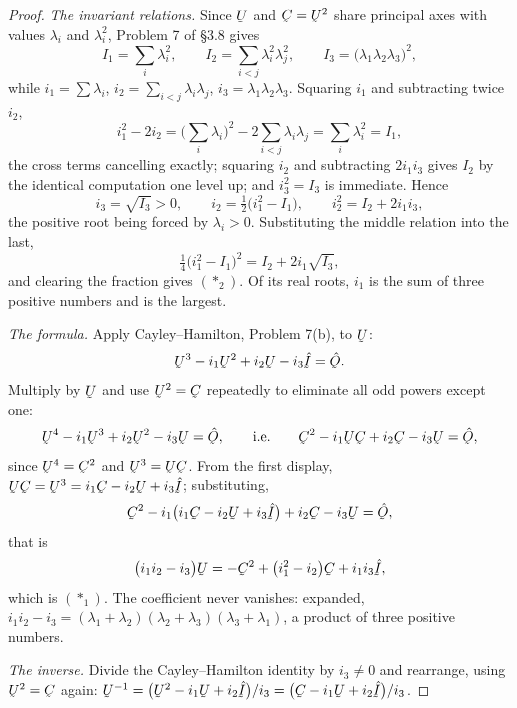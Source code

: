 \begin{proof}
\emph{The invariant relations.} Since $\bU$ and $\bC=\bU^{2}$ share
principal axes with values $\lambda_{i}$ and $\lambda_{i}^{2}$, Problem 7
of \S3.8 gives
\[
   I_{1}=\sum_{i}\lambda_{i}^{2},\qquad
   I_{2}=\sum_{i<j}\lambda_{i}^{2}\lambda_{j}^{2},\qquad
   I_{3}=\big(\lambda_{1}\lambda_{2}\lambda_{3}\big)^{2},
\]
while $i_{1}=\sum\lambda_{i}$, $i_{2}=\sum_{i<j}\lambda_{i}\lambda_{j}$,
$i_{3}=\lambda_{1}\lambda_{2}\lambda_{3}$. Squaring $i_{1}$ and
subtracting twice $i_{2}$,
\[
   i_{1}^{2}-2i_{2}
   =\Big(\sum_{i}\lambda_{i}\Big)^{2}-2\sum_{i<j}\lambda_{i}\lambda_{j}
   =\sum_{i}\lambda_{i}^{2}=I_{1},
\]
the cross terms cancelling exactly; squaring $i_{2}$ and subtracting
$2i_{1}i_{3}$ gives $I_{2}$ by the identical computation one level up; and
$i_{3}^{2}=I_{3}$ is immediate. Hence
\[
   i_{3}=\sqrt{I_{3}}>0,\qquad
   i_{2}=\tfrac12\big(i_{1}^{2}-I_{1}\big),\qquad
   i_{2}^{2}=I_{2}+2i_{1}i_{3},
\]
the positive root being forced by $\lambda_{i}>0$. Substituting the middle
relation into the last,
\[
   \tfrac14\big(i_{1}^{2}-I_{1}\big)^{2}=I_{2}+2i_{1}\sqrt{I_{3}},
\]
and clearing the fraction gives $(\ast_{2})$. Of its real roots, $i_{1}$ is
the sum of three positive numbers and is the largest.

\emph{The formula.} Apply Cayley--Hamilton, Problem 7(b), to $\bU$:
\[
   \bU^{3}-i_{1}\bU^{2}+i_{2}\bU-i_{3}\hI=\hOb .
\]
Multiply by $\bU$ and use $\bU^{2}=\bC$ repeatedly to eliminate all odd
powers except one:
\[
   \bU^{4}-i_{1}\bU^{3}+i_{2}\bU^{2}-i_{3}\bU=\hOb,
   \qquad\text{i.e.}\qquad
   \bC^{2}-i_{1}\bU\bC+i_{2}\bC-i_{3}\bU=\hOb ,
\]
since $\bU^{4}=\bC^{2}$ and $\bU^{3}=\bU\bC$. From the first display,
$\bU\bC=\bU^{3}=i_{1}\bC-i_{2}\bU+i_{3}\hI$; substituting,
\[
   \bC^{2}-i_{1}\big(i_{1}\bC-i_{2}\bU+i_{3}\hI\big)+i_{2}\bC-i_{3}\bU
   =\hOb ,
\]
that is
\[
   \big(i_{1}i_{2}-i_{3}\big)\bU
   =-\bC^{2}+\big(i_{1}^{2}-i_{2}\big)\bC+i_{1}i_{3}\hI ,
\]
which is $(\ast_{1})$. The coefficient never vanishes: expanded,
$i_{1}i_{2}-i_{3}=(\lambda_{1}+\lambda_{2})(\lambda_{2}+\lambda_{3})
(\lambda_{3}+\lambda_{1})$, a product of three positive numbers.

\emph{The inverse.} Divide the Cayley--Hamilton identity by $i_{3}\neq0$
and rearrange, using $\bU^{2}=\bC$ again:
$\bU^{-1}=\big(\bU^{2}-i_{1}\bU+i_{2}\hI\big)/i_{3}
=\big(\bC-i_{1}\bU+i_{2}\hI\big)/i_{3}$.
\end{proof}

